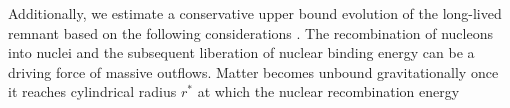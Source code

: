 Additionally, we estimate a conservative upper bound evolution of the 
long-lived remnant based on the following considerations \citep{Radice:2018xqa}.
%
%
%
%
%
The recombination of nucleons into nuclei and the subsequent 
liberation of nuclear binding energy can be a driving force 
of massive outflows. Matter becomes unbound gravitationally 
once it reaches cylindrical radius $r^*$ at which the nuclear recombination energy 
